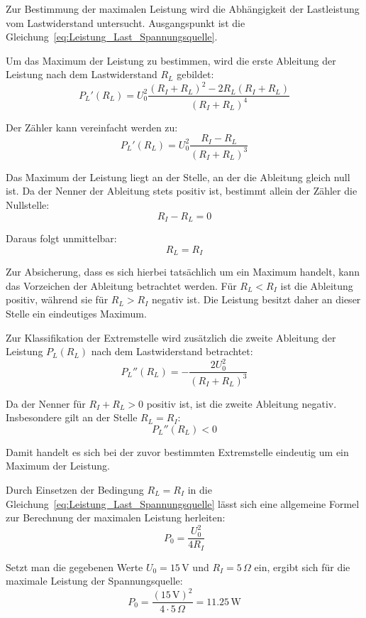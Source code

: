 
\noindent
Zur Bestimmung der maximalen Leistung wird die Abhängigkeit der Lastleistung vom Lastwiderstand untersucht. 
Ausgangspunkt ist die Gleichung~\ref{eq:Leistung_Last_Spannungsquelle}.

\noindent
Um das Maximum der Leistung zu bestimmen, wird die erste Ableitung der Leistung nach dem Lastwiderstand $R_L$ gebildet:
\begin{equation}
\label{eq:dPL_dRL}
P_L'(R_L)
= U_0^2 \frac{(R_I + R_L)^2 - 2R_L(R_I + R_L)}{(R_I + R_L)^4}
\end{equation}

\noindent
Der Zähler kann vereinfacht werden zu:
\begin{equation}
\label{eq:dPL_dRL_simpl}
P_L'(R_L)
= U_0^2 \frac{R_I - R_L}{(R_I + R_L)^3}
\end{equation}

\noindent
Das Maximum der Leistung liegt an der Stelle, an der die Ableitung gleich null ist. Da der Nenner der Ableitung stets positiv ist, bestimmt allein der Zähler die Nullstelle:
\begin{equation}
\label{eq:nullstelle_zaehler}
R_I - R_L = 0
\end{equation}

\noindent
Daraus folgt unmittelbar:
\begin{equation}
\label{eq:RL_eq_RI}
R_L = R_I
\end{equation}

\noindent
Zur Absicherung, dass es sich hierbei tatsächlich um ein Maximum handelt, kann das Vorzeichen der Ableitung betrachtet werden. Für $R_L < R_I$ ist die Ableitung positiv, während sie für $R_L > R_I$ negativ ist. Die Leistung besitzt daher an dieser Stelle ein eindeutiges Maximum.

\noindent
Zur Klassifikation der Extremstelle wird zusätzlich die zweite Ableitung der Leistung $P_L(R_L)$ nach dem Lastwiderstand betrachtet:
\begin{equation}
\label{eq:d2PL_dRL2}
P_L''(R_L)
= -\frac{2U_0^2}{(R_I + R_L)^3}
\end{equation}

\noindent
Da der Nenner für $R_I + R_L > 0$ positiv ist, ist die zweite Ableitung negativ. Insbesondere gilt an der Stelle $R_L = R_I$:
\begin{equation}
\label{eq:d2PL_negative_at_max}
P_L''(R_L) < 0
\end{equation}

\noindent
Damit handelt es sich bei der zuvor bestimmten Extremstelle eindeutig um ein Maximum der Leistung.

\noindent
Durch Einsetzen der Bedingung $R_L = R_I$ in die Gleichung~\ref{eq:Leistung_Last_Spannungsquelle} lässt sich eine allgemeine Formel zur Berechnung der maximalen Leistung herleiten:
\begin{equation}
\label{eq:P0}
P_0 = \frac{U_0^2}{4R_I}
\end{equation}

\noindent
Setzt man die gegebenen Werte $U_0 = 15\,\mathrm{V}$ und $R_I = 5\,\Omega$ ein, ergibt sich für die maximale Leistung der Spannungsquelle:
\begin{equation*}
\label{eq:P0_numeric}
P_0 = \frac{(15\,\mathrm{V})^2}{4 \cdot 5\,\Omega} = 11.25\,\mathrm{W}
\end{equation*}
